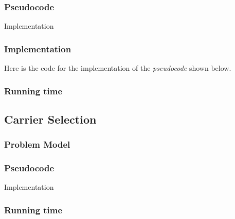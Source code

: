 \documentclass{article}
\begin{document}
\subsubsection*{Pseudocode}

\begin{algorithm}[H]
\caption{Implementation}
\begin{algorithmic}[1]
\end{algorithmic}
\end{algorithm}

\subsubsection*{Implementation}

Here is the code for the implementation of the \textit{pseudocode} shown below.



\subsubsection*{Running time}


\subsection*{Carrier Selection}

\subsubsection*{Problem Model}

\subsubsection*{Pseudocode}

\begin{algorithm}[H]
\caption{Implementation}
\begin{algorithmic}[1]
\end{algorithmic}
\end{algorithm}

\subsubsection*{Running time}
\end{document}
